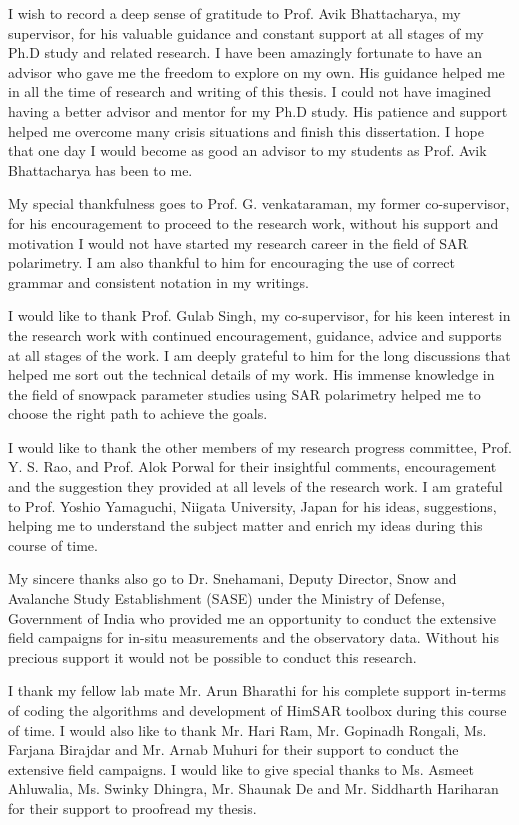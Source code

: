 \documentclass[a4paper,plainchapterheads,yschapters,twoside,truedoublelespace,openright]{iitbthesis}
\begin{document}
\begin{acknowledgments}
\vspace{10mm}
I wish to record a deep sense of gratitude to Prof. Avik Bhattacharya, my supervisor, for his valuable guidance and constant support at all stages of my Ph.D study and related research. I have been amazingly fortunate to have an advisor who gave me the freedom to explore on my own. His guidance helped me in all the time of research and writing of this thesis. I could not have imagined having a better advisor and mentor for my Ph.D study. His patience and support helped me overcome many crisis situations and finish this dissertation. I hope that one day I would become as good an advisor to my students as Prof. Avik Bhattacharya has been to me.

My special thankfulness goes to Prof. G. venkataraman, my former co-supervisor, for his encouragement to proceed to the research work, without his support and motivation I would not have started my research career in the field of SAR polarimetry. I am also thankful to him for encouraging the use of correct grammar and consistent notation in my writings.

I would like to thank Prof. Gulab Singh, my co-supervisor, for his keen interest in the research work with continued encouragement, guidance, advice and supports at all stages of the work. I am deeply grateful to him for the long discussions that helped me sort out the technical details of my work. His immense knowledge in the field of snowpack parameter studies using SAR polarimetry helped me to choose the right path to achieve the goals. 

I would like to thank the other members of my research progress committee, Prof. Y. S. Rao, and Prof. Alok Porwal for their insightful comments, encouragement and the suggestion they provided at all levels of the research work. I am grateful to Prof. Yoshio Yamaguchi, Niigata University, Japan for his ideas, suggestions, helping me to understand the subject matter and enrich my ideas during this course of time.

My sincere thanks also go to Dr. Snehamani, Deputy Director, Snow and Avalanche Study Establishment (SASE) under the Ministry of Defense, Government of India who provided me an opportunity to conduct the extensive field campaigns for in-situ measurements and the observatory data. Without his precious support it would not be possible to conduct this research.

I thank my fellow lab mate Mr. Arun Bharathi for his complete support in-terms of coding the algorithms and development of HimSAR toolbox during this course of time. I would also like to thank Mr. Hari Ram, Mr. Gopinadh Rongali, Ms. Farjana Birajdar and Mr. Arnab Muhuri for their support to conduct the extensive field campaigns. I would like to give special thanks to Ms. Asmeet Ahluwalia, Ms. Swinky Dhingra, Mr. Shaunak De and  Mr. Siddharth Hariharan for their support to proofread my thesis. 


\end{acknowledgments}
\end{document}
